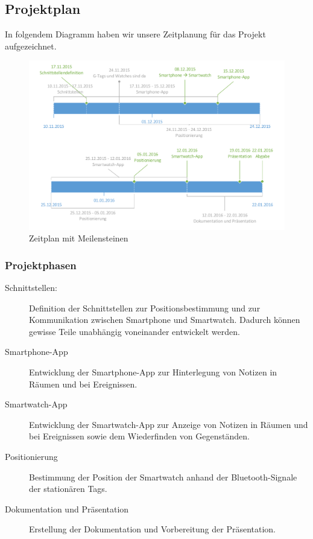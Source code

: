 \subsection{Projektplan}

In folgendem Diagramm haben wir unsere Zeitplanung für das Projekt aufgezeichnet.

\begin{figure}[tbh]
\centering
\includegraphics[width=1.0\linewidth]{Bilder/Zeitplan-1}
\caption{Zeitplan mit Meilensteinen}
\label{fig:Zeitplan-1}
\end{figure}

\subsubsection{Projektphasen}
\begin{description}
	\item[Schnittstellen:] Definition der Schnittstellen zur Positionsbestimmung und zur Kommunikation zwischen
	Smartphone und Smartwatch. Dadurch können gewisse Teile unabhängig voneinander entwickelt werden.
	\item[Smartphone-App] Entwicklung der Smartphone-App zur Hinterlegung von Notizen in Räumen und bei Ereignissen.
	\item[Smartwatch-App] Entwicklung der Smartwatch-App zur Anzeige von Notizen in Räumen und bei Ereignissen sowie
	dem Wiederfinden von Gegenständen.
	\item[Positionierung] Bestimmung der Position der Smartwatch anhand der Bluetooth-Signale der stationären Tags.
	\item[Dokumentation und Präsentation] Erstellung der Dokumentation und Vorbereitung der Präsentation.
\end{description}


